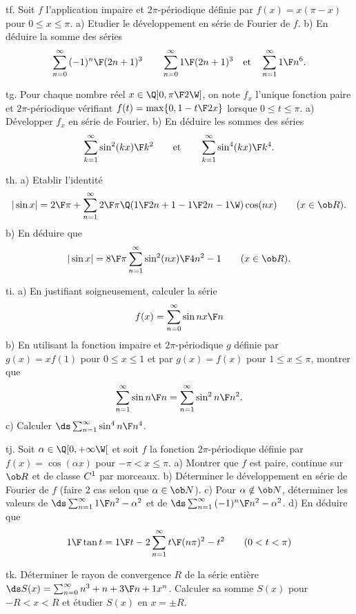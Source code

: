 \exo [Level=2,Fight=0,Learn=0,Type=\Exercices,Field=\SériesDeFourier,Origin=] tf. 
Soit $f$ l'application impaire et $2\pi$-périodique définie par $f(x)=x(\pi-x)$ 
pour $0\le x\le\pi$. \pn
a) Etudier le développement en série de Fourier de $f$. \pn
b) En déduire la somme des séries 
$$
\sum_{n=0}^\infty{(-1)^n\F(2n+1)^3}\qquad\sum_{n=0}^\infty{1\F(2n+1)^3}
\quad\hbox{et}\quad\sum_{n=1}^\infty{1\F n^6}. 
$$

\exo [Level=2,Fight=0,Learn=0,Type=\Exercices,Field=\SériesDeFourier,Origin=] tg. 
Pour chaque nombre réel $x\in\Q]0,{\pi\F2}\W]$, on note $f_x$ 
l'unique fonction paire et $2\pi$-périodique vérifiant $f(t)=\max\{0, 1-{t\F2x}\}$ lorsque $0\le t\le \pi$. \pn
a) Développer $f_x$ en série de Fourier.\pn 
b) En déduire les sommes des séries 
$$
\sum_{k=1}^\infty{\sin^2(kx)\F k^2}\qquad\hbox{et}\qquad\sum_{k=1}^\infty{\sin^4(kx)\F k^4}.
$$

\exo [Level=2,Fight=0,Learn=0,Type=\Exercices,Field=\SériesDeFourier,Origin=] th. 
a) Etablir l'identité 
$$
|\sin x|={2\F\pi}+\sum_{n=1}^\infty{2\F\pi}\Q({1\F2n+1}-{1\F2n-1}\W)\cos(nx)\qquad(x\in\ob R).
$$
b) En déduire que 
$$
|\sin x|={8\F\pi}\sum_{n=1}^\infty{\sin^2(nx)\F4n^2-1}\qquad(x\in\ob R).
$$  

\exo [Level=2,Fight=0,Learn=0,Type=\Exercices,Field=\SériesDeFourier,Origin=] ti. 
a) En justifiant soigneusement, calculer la série
$$
f(x)=\sum_{n=0}^\infty{\sin nx\F n}
$$
b) En utilisant la fonction impaire et $2\pi$-périodique $g$ définie par 
$g(x)=xf(1)$ pour $0\le x\le 1$ et par $g(x)=f(x)$ pour $1\le x\le \pi$, montrer que 
$$
\sum_{n=1}^\infty{\sin n\F n}=\sum_{n=1}^\infty{\sin^2n\F n^2}. 
$$ 
c) Calculer $\ds \sum_{n=1}^\infty{\sin^4 n\F n^4}$. 

\exo [Level=2,Fight=0,Learn=0,Type=\Exercices,Field=\SériesDeFourier,Origin=] tj. 
Soit $\alpha\in\Q[0,+\infty\W[$ et soit $f$ la fonction $2\pi$-périodique 
définie par $f(x)=\cos (\alpha x)$ 
pour $-\pi< x\le \pi$. \pn
a) Montrer que $f$ est paire, continue sur $\ob R$ et de classe $\sc C^1$ 
par morceaux. \pn
b) Déterminer le développement en série de Fourier de $f$ (faire $2$ 
cas selon que $\alpha\in\ob N$). \pn
c) Pour $\alpha\notin\ob N$, déterminer les valeurs de $\ds \sum_{n=1}^\infty{1\F n^2-\alpha^2}$ 
et de 
$\ds \sum_{n=1}^\infty{(-1)^n\F n^2-\alpha^2}$. \pn
d) En déduire que 
$$
{1\F\tan t}={1\F t}-2\sum_{n=1}^\infty{t\F (n\pi)^2-t^2}\qquad(0<t<\pi)
$$

\exo [Level=2,Fight=0,Learn=0,Type=\Exercices,Field=\SériesEntières,Origin=] tk. 
Déterminer le rayon de convergence $R$ de la série entière 
$\ds S(x)=\sum_{n=0}^\infty{n^3+n+3\F n+1}x^n$. Calculer sa somme $S(x)$ pour $-R<x<R$ 
et étudier $S(x)$ en $x=\pm R$. 

